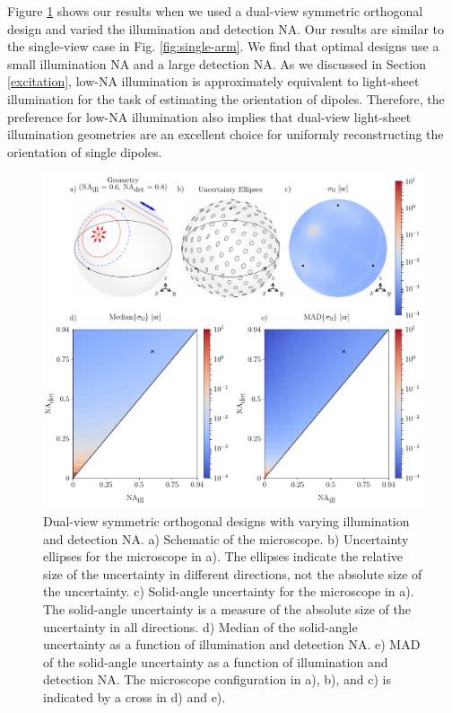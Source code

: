 \documentclass[10pt]{article}
\begin{document}
Figure \ref{fig:double-arm} shows our results when we used a dual-view symmetric
orthogonal design and varied the illumination and detection NA. Our results are
similar to the single-view case in {\color{urlblue}Fig.} \ref{fig:single-arm}. We find that
optimal designs use a small illumination NA and a large detection NA. As we
discussed in Section \ref{excitation}, low-NA illumination is
approximately equivalent to light-sheet illumination for the task of estimating
the orientation of dipoles. Therefore, the preference for low-NA
illumination also implies that dual-view light-sheet illumination geometries are
an excellent choice for uniformly reconstructing the orientation of single
dipoles.

\begin{figure}[htbp]
\centering\includegraphics[width=\textwidth]{double-arm}
\caption{Dual-view symmetric orthogonal designs with varying
  illumination and detection NA. a) Schematic of the microscope. b) Uncertainty
  ellipses for the microscope in a). The ellipses indicate the relative size of
  the uncertainty in different directions, not the absolute size of the
  uncertainty. c) Solid-angle uncertainty for the microscope in a). The
  solid-angle uncertainty is a measure of the absolute size of the uncertainty
  in all directions. d) Median of the solid-angle uncertainty as a function of
  illumination and detection NA. e) MAD of the solid-angle uncertainty
  as a function of illumination and detection NA. The microscope configuration
  in a), b), and c) is indicated by a cross in d) and e).}
\label{fig:double-arm}
\end{figure}
\end{document}

